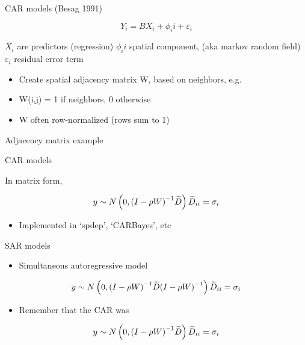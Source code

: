 \documentclass[ignorenonframetext,]{beamer}
\providecommand{\tightlist}{%
  \setlength{\itemsep}{0pt}\setlength{\parskip}{0pt}}
\begin{document}
\begin{frame}{CAR models (Besag 1991)}
\protect\hypertarget{car-models-besag-1991}{}

\[{ Y }_{ i }=B{ X }_{ i }+{ \phi  }_{ i }i+{ \varepsilon  }_{ i }\]

\({ X }_{ i }\) are predictors (regression) \({ \phi }_{ i }i\) spatial
component, (aka markov random field) \({ \varepsilon }_{ i }\) residual
error term

\begin{itemize}
\tightlist
\item
  Create spatial adjacency matrix W, based on neighbors, e.g.
\item
  W(i,j) = 1 if neighbors, 0 otherwise
\item
  W often row-normalized (rows sum to 1)
\end{itemize}

\end{frame}

\begin{frame}{Adjacency matrix example}
\protect\hypertarget{adjacency-matrix-example}{}

\end{frame}

\begin{frame}{CAR models}
\protect\hypertarget{car-models}{}

In matrix form,

\[{ y\sim N\left( 0,{ \left( I-\rho W \right)  }^{ -1 }\widetilde { D }  \right) \\ { \widetilde { D }  }_{ ii }={ \sigma  }_{ i } }\]

\begin{itemize}
\tightlist
\item
  Implemented in `spdep', `CARBayes', etc
\end{itemize}

\end{frame}

\begin{frame}{SAR models}
\protect\hypertarget{sar-models}{}

\begin{itemize}
\tightlist
\item
  Simultaneous autoregressive model
\end{itemize}

\[{ y\sim N\left( 0,{ \left( I-\rho W \right)  }^{ -1 }\widetilde { D } { \left( I-\rho W \right)  }^{ -1 } \right) \\ { \widetilde { D }  }_{ ii }={ \sigma  }_{ i } }\]

\begin{itemize}
\tightlist
\item
  Remember that the CAR was
\end{itemize}

\[{ y\sim N\left( 0,{ \left( I-\rho W \right)  }^{ -1 }\widetilde { D }  \right) \\ { \widetilde { D }  }_{ ii }={ \sigma  }_{ i } }\]

\end{frame}
\end{document}
